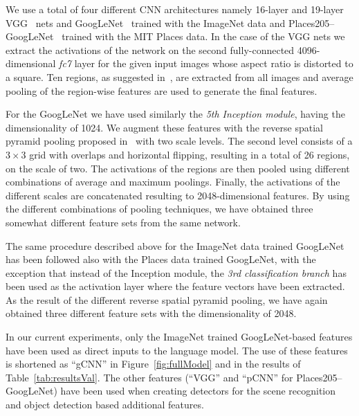 We use a total of four different CNN architectures namely 16-layer
and 19-layer VGG~\cite{Simonyan14c} nets and
GoogLeNet~\cite{DBLP:journals/corr/SzegedyLJSRAEVR14} trained with the
ImageNet data and Places205--GoogLeNet~\cite{Zhou2014NIPS} trained with
the MIT Places data.
In the case of the VGG nets we extract the activations of the network on
the second fully-connected 4096-dimensional \emph{fc7} layer for the
given input images whose aspect ratio is distorted to a square.
Ten regions, as suggested in~\cite{Krizhevsky2012}, are extracted
from all images and average pooling of the region-wise features are
used to generate the final features.

For the GoogLeNet we have used similarly the \emph{5th Inception
  module}, having the dimensionality of 1024.
We augment these features with the reverse spatial
pyramid pooling proposed in~\cite{Gong2014} with two scale levels.
The second level consists of a $3\times3$ grid with overlaps and
horizontal flipping, resulting in a total of 26 regions, on the scale
of two.
The activations of the regions are then pooled using different
combinations of average and maximum poolings.
Finally, the activations of the different scales are concatenated
resulting to 2048-dimensional features.
By using the different combinations of pooling techniques, we have
obtained three somewhat different feature sets from the same network.

The same procedure described above for the ImageNet data trained
GoogLeNet has been followed also with the Places data trained
GoogLeNet, with the exception that instead of the Inception module,
the \emph{3rd classification branch} has been used as the activation
layer where the feature vectors have been extracted.
As the result of the different reverse spatial pyramid pooling, we
have again obtained three different feature sets with the
dimensionality of 2048.

In our current experiments, only the ImageNet trained GoogLeNet-based
features have been used as direct inputs to the language model.
The use of these features is shortened as ``gCNN'' in
Figure~\ref{fig:fullModel} and in the results of
Table~\ref{tab:resultsVal}.
The other features (``VGG'' and ``pCNN'' for Places205--GoogLeNet)
have been used when creating detectors for the scene recognition and
object detection based additional features.

